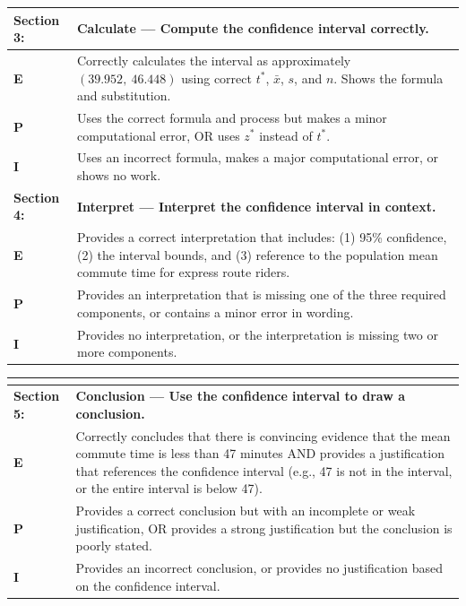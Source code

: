 \documentclass[12pt]{article}
\begin{document}
\renewcommand{\arraystretch}{1.6}
\begin{tabular}{|>{\bfseries}p{3cm}|p{11cm}|}
\hline
Section 3: & \textbf{Calculate --- Compute the confidence interval correctly.} \\
\hline
E & Correctly calculates the interval as approximately $(39.952,\ 46.448)$ using correct $t^*$, $\bar{x}$, $s$, and $n$. Shows the formula and substitution. \\
\hline
P & Uses the correct formula and process but makes a minor computational error, OR uses $z^*$ instead of $t^*$. \\
\hline
I & Uses an incorrect formula, makes a major computational error, or shows no work. \\
\hline
\hline
Section 4: & \textbf{Interpret --- Interpret the confidence interval in context.} \\
\hline
E & Provides a correct interpretation that includes: (1) 95\% confidence, (2) the interval bounds, and (3) reference to the population mean commute time for express route riders. \\
\hline
P & Provides an interpretation that is missing one of the three required components, or contains a minor error in wording. \\
\hline
I & Provides no interpretation, or the interpretation is missing two or more components. \\
\hline
\end{tabular}

\vspace{0.5cm}

\renewcommand{\arraystretch}{1.6}
\begin{tabular}{|>{\bfseries}p{3cm}|p{11cm}|}
\hline
\multicolumn{2}{|c|}{\textbf{Part (b): Drawing a Conclusion}} \\
\hline
\hline
Section 5: & \textbf{Conclusion --- Use the confidence interval to draw a conclusion.} \\
\hline
E & Correctly concludes that there is convincing evidence that the mean commute time is less than 47 minutes AND provides a justification that references the confidence interval (e.g., 47 is not in the interval, or the entire interval is below 47). \\
\hline
P & Provides a correct conclusion but with an incomplete or weak justification, OR provides a strong justification but the conclusion is poorly stated. \\
\hline
I & Provides an incorrect conclusion, or provides no justification based on the confidence interval. \\
\hline
\end{tabular}
\end{document}
